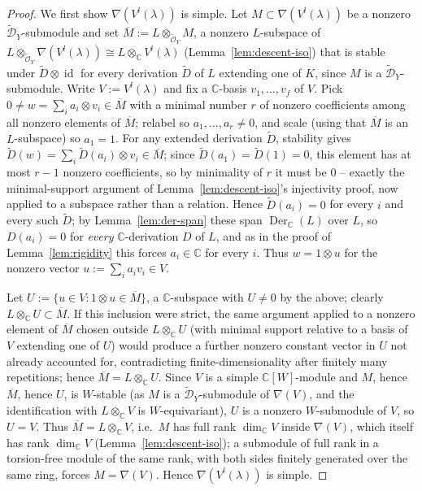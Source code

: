 \documentclass[10pt,a4paper]{amsart}
\begin{document}
\begin{proof}
We first show $\nabla(V^l(\lambda))$ is simple. Let $M \subset \nabla(V^l(\lambda))$
be a nonzero $\widetilde{\mathcal{D}}_Y$-submodule and set
$\overline M := L \otimes_{\widetilde{\mathcal{O}}_Y} M$, a nonzero
$L$-subspace of
$L \otimes_{\widetilde{\mathcal{O}}_Y} \nabla(V^l(\lambda)) \cong L \otimes_{\mathbb{C}} V^l(\lambda)$
(Lemma~\ref{lem:descent-iso}) that is stable under
$\widetilde D \otimes \operatorname{id}$ for every derivation
$\widetilde D$ of $L$ extending one of $K$, since $M$ is a
$\widetilde{\mathcal{D}}_Y$-submodule. Write $V := V^l(\lambda)$ and
fix a $\mathbb{C}$-basis $v_1,\dots,v_f$ of $V$. Pick
$0 \ne w = \sum_i a_i \otimes v_i \in \overline M$ with a minimal
number $r$ of nonzero coefficients among all nonzero elements of
$\overline M$; relabel so $a_1,\dots,a_r \ne 0$, and scale (using that
$\overline M$ is an $L$-subspace) so $a_1 = 1$. For any extended
derivation $\widetilde D$, stability gives
$\widetilde D(w) = \sum_i \widetilde D(a_i) \otimes v_i \in \overline M$;
since $\widetilde D(a_1) = \widetilde D(1) = 0$, this element has at
most $r-1$ nonzero coefficients, so by minimality of $r$ it must be
$0$ -- exactly the minimal-support argument of
Lemma~\ref{lem:descent-iso}'s injectivity proof, now applied to a
subspace rather than a relation. Hence $\widetilde D(a_i) = 0$ for
every $i$ and every such $\widetilde D$; by Lemma~\ref{lem:der-span}
these span $\operatorname{Der}_{\mathbb{C}}(L)$ over $L$, so
$D(a_i) = 0$ for \emph{every} $\mathbb{C}$-derivation $D$ of $L$, and
as in the proof of Lemma~\ref{lem:rigidity} this forces $a_i \in \mathbb{C}$
for every $i$. Thus $w = 1 \otimes u$ for the nonzero vector
$u := \sum_i a_i v_i \in V$.

Let $U := \{u \in V : 1 \otimes u \in \overline M\}$, a
$\mathbb{C}$-subspace with $U \ne 0$ by the above; clearly
$L \otimes_{\mathbb{C}} U \subset \overline M$. If this inclusion were
strict, the same argument applied to a nonzero element of
$\overline M$ chosen outside $L \otimes_{\mathbb{C}} U$ (with minimal
support relative to a basis of $V$ extending one of $U$) would
produce a further nonzero constant vector in $U$ not already
accounted for, contradicting finite-dimensionality after finitely
many repetitions; hence $\overline M = L \otimes_{\mathbb{C}} U$.
Since $V$ is a simple $\mathbb{C}[W]$-module and $M$, hence
$\overline M$, hence $U$, is $W$-stable (as $M$ is a
$\widetilde{\mathcal{D}}_Y$-submodule of $\nabla(V)$, and the
identification with $L\otimes_{\mathbb C}V$ is $W$-equivariant), $U$
is a nonzero $W$-submodule of $V$, so $U = V$. Thus
$\overline M = L \otimes_{\mathbb{C}} V$, i.e.\ $M$ has full rank
$\dim_{\mathbb{C}} V$ inside $\nabla(V)$, which itself has rank
$\dim_{\mathbb{C}} V$ (Lemma~\ref{lem:descent-iso}); a submodule of
full rank in a torsion-free module of the same rank, with both sides
finitely generated over the same ring, forces $M = \nabla(V)$.
Hence $\nabla(V^l(\lambda))$ is simple.


\end{proof}
\end{document}
